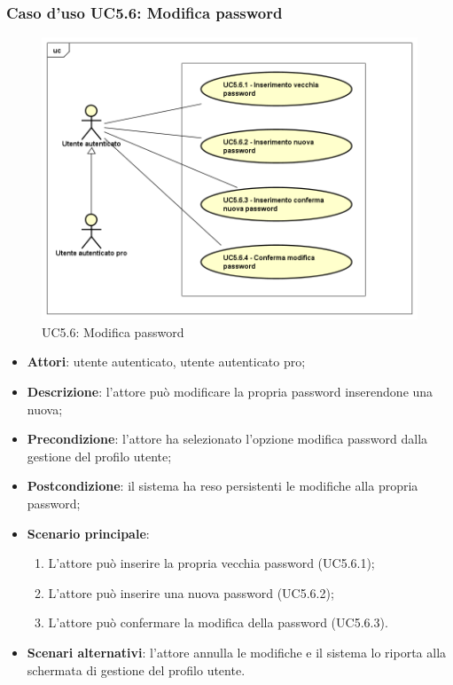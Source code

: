 \subsubsection{Caso d'uso UC5.6: Modifica password}
\label{UC5.6}
\begin{figure}[h]
	\centering
	\includegraphics[scale=0.5,keepaspectratio]{UML/UC5_6.png}
	\caption{UC5.6: Modifica password}
\end{figure}

\begin{itemize}
	\item \textbf{Attori}: utente autenticato, utente autenticato pro;
	\item \textbf{Descrizione}: l'attore può modificare la propria password inserendone una nuova;
	\item \textbf{Precondizione}:  l'attore ha selezionato l'opzione modifica password dalla gestione del profilo utente;
	\item \textbf{Postcondizione}: il sistema ha reso persistenti le modifiche alla propria password;
	\item \textbf{Scenario principale}:
	\begin{enumerate}
		\item L'attore può inserire la propria vecchia password (UC5.6.1);
		\item L'attore può inserire una nuova password (UC5.6.2);
		\item L'attore può confermare la modifica della password (UC5.6.3).
	\end{enumerate}
	\item \textbf{Scenari alternativi}: l'attore annulla le modifiche e il sistema lo riporta alla schermata di gestione del profilo utente.
\end{itemize}

